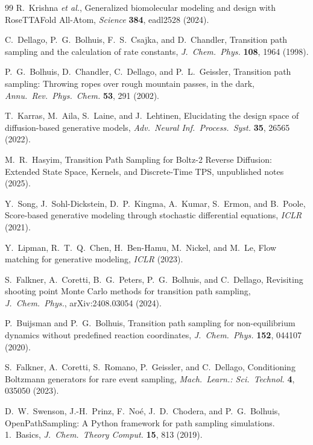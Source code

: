 \documentclass[aps,prl,twocolumn,superscriptaddress,floatfix]{revtex4-2}
\begin{document}
\begin{thebibliography}{99}
R.~Krishna \textit{et al.},
Generalized biomolecular modeling and design with RoseTTAFold All-Atom,
\textit{Science} \textbf{384}, eadl2528 (2024).

C.~Dellago, P.~G.~Bolhuis, F.~S.~Csajka, and D.~Chandler,
Transition path sampling and the calculation of rate constants,
\textit{J.~Chem.~Phys.} \textbf{108}, 1964 (1998).

P.~G.~Bolhuis, D.~Chandler, C.~Dellago, and P.~L.~Geissler,
Transition path sampling: Throwing ropes over rough mountain passes, in the dark,
\textit{Annu.~Rev.~Phys.~Chem.} \textbf{53}, 291 (2002).

T.~Karras, M.~Aila, S.~Laine, and J.~Lehtinen,
Elucidating the design space of diffusion-based generative models,
\textit{Adv.~Neural Inf.~Process.~Syst.} \textbf{35}, 26565 (2022).

M.~R.~Hasyim,
Transition Path Sampling for Boltz-2 Reverse Diffusion: Extended State Space,
Kernels, and Discrete-Time TPS,
unpublished notes (2025).

Y.~Song, J.~Sohl-Dickstein, D.~P.~Kingma, A.~Kumar, S.~Ermon, and B.~Poole,
Score-based generative modeling through stochastic differential equations,
\textit{ICLR} (2021).

Y.~Lipman, R.~T.~Q.~Chen, H.~Ben-Hamu, M.~Nickel, and M.~Le,
Flow matching for generative modeling,
\textit{ICLR} (2023).

S.~Falkner, A.~Coretti, B.~G.~Peters, P.~G.~Bolhuis, and C.~Dellago,
Revisiting shooting point Monte Carlo methods for transition path sampling,
\textit{J.~Chem.~Phys.}, arXiv:2408.03054 (2024).

P.~Buijsman and P.~G.~Bolhuis,
Transition path sampling for non-equilibrium dynamics without predefined
reaction coordinates,
\textit{J.~Chem.~Phys.} \textbf{152}, 044107 (2020).

S.~Falkner, A.~Coretti, S.~Romano, P.~Geissler, and C.~Dellago,
Conditioning Boltzmann generators for rare event sampling,
\textit{Mach.~Learn.: Sci.~Technol.} \textbf{4}, 035050 (2023).

D.~W.~Swenson, J.-H.~Prinz, F.~Noé, J.~D.~Chodera, and P.~G.~Bolhuis,
OpenPathSampling: A Python framework for path sampling simulations.
1.~Basics,
\textit{J.~Chem.~Theory Comput.} \textbf{15}, 813 (2019).

\end{thebibliography}
\end{document}
